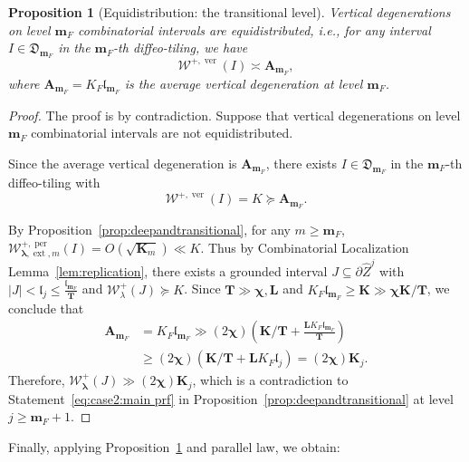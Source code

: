 \documentclass{amsart}
\newcommand{\1}{{\mathbb 1 }}
\newcommand{\blambda}{{\boldsymbol\lambda}}
\newcommand{\ext}{{\operatorname{ext}}}
\newcommand{\Width}{{\mathcal W}}
\newcommand{\bA}{{\mathbf{A}}}
\newcommand{\wZ}{{\widehat Z}}
\newcommand{\bL}{{\mathbf L}}
\newcommand{\bT}{{\mathbf T}}
\newcommand{\bK}{{\mathbf K}}
\newcommand{\bbm}{{\mathbf m}}
\newcommand{\length}{{\mathfrak l}}
\newcommand\ver{{\operatorname{ver}}}
\newcommand\per{{\operatorname{per}}}
\newtheorem{prop}[thm]{Proposition}
\theoremstyle{remark}
\numberwithin{equation}{section}
\theoremstyle{definition}
\newcommand{\bchi}{{\boldsymbol{ \chi}}}
\begin{document}
\begin{prop}[Equidistribution: the transitional level]\label{prop:equidcombinbatorial}
    Vertical degenerations on level $\bbm_F$ combinatorial intervals are equidistributed, i.e., for any interval $I \in \mathfrak{D}_{\bbm_F}$ in the $\bbm_F$-th diffeo-tiling, we have
    $$
    \Width^{+, \ver}(I) \asymp \bA_{\bbm_F},
    $$
    where $\bA_{\bbm_F} = K_F\length_{\bbm_F}$ is the average vertical degeneration at level $\bbm_F$.
\end{prop}
\begin{proof}
The proof is by contradiction. Suppose that vertical degenerations on level $\bbm_F$ combinatorial intervals are not equidistributed.

Since the average vertical degeneration is $\bA_{\bbm_F}$, there exists $I \in \mathfrak{D}_{\bbm_F}$ in the $\bbm_F$-th diffeo-tiling with 
$$
\Width^{+, \ver}(I) = K \succeq \bA_{\bbm_F}.
$$




By Proposition~\ref{prop:deepandtransitional}, for any $m \geq \bbm_F$, $\Width^{+, \per}_{\blambda,\ext, m} (I) =O(\sqrt{\bK_m}) \ll K$. 
Thus by Combinatorial Localization Lemma~\ref{lem:replication}, there exists a grounded interval $J \subseteq \partial \wZ^j$ with $|J| < \length_j \leq \frac{\length_{\bbm_F}}{\bT}$ and $\Width^+_\lambda(J) \succeq K$.
Since $\bT \gg \bchi, \bL$ and $K_F\length_{\bbm_F} \geq \bK \gg \bchi \bK/\bT$, we conclude that 
\begin{align*}
    \bA_{\bbm_F} &= K_F\length_{\bbm_F} \gg (2\bchi) (\bK/\bT + \frac{\bL K_F\length_{\bbm_F}}{\bT}) \\
    &\geq (2\bchi) (\bK/\bT + \bL K_F\length_{j}) = (2\bchi) \bK_j.
\end{align*}
Therefore, $\Width^+_\blambda(J) \gg (2\bchi) \bK_j$, which is a contradiction to Statement~\ref{eq:case2:main prf} in Proposition~\ref{prop:deepandtransitional} at level $j \geq \bbm_F+1$.
\end{proof}

Finally, applying Proposition~\ref{prop:equidcombinbatorial} and parallel law, we obtain: 
\end{document}
